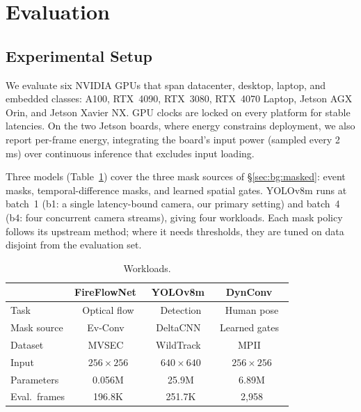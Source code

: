 \section{Evaluation}
\label{sec:eval}

\subsection{Experimental Setup}
\label{sec:eval:setup}

We evaluate six NVIDIA GPUs that span datacenter, desktop, laptop, and
embedded classes: A100, RTX~4090, RTX~3080, RTX~4070 Laptop, Jetson AGX Orin,
and Jetson Xavier NX. GPU clocks are locked on every platform for stable latencies. On the two Jetson boards, where energy constrains deployment, we also report per-frame energy, integrating the board's input power
(sampled every 2\,ms) over continuous inference that excludes input loading.

Three models (Table~\ref{tab:workloads}) cover the three mask sources of
\S\ref{sec:bg:masked}: event masks, temporal-difference masks, and learned
spatial gates. YOLOv8m runs at batch~1 (b1: a single latency-bound camera, our
primary setting) and batch~4 (b4: four concurrent camera streams), giving four
workloads. Each mask policy follows its upstream method; where it needs
thresholds, they are tuned on data disjoint from the evaluation set.

\begin{table}[t]
\centering
\caption{Workloads.}
\label{tab:workloads}
\small
\setlength{\tabcolsep}{4pt}
\begin{tabular}{@{}lccc@{}}
\toprule
 & \textbf{FireFlowNet}~\cite{fireflownet} & \textbf{YOLOv8m}~\cite{yolov8} & \textbf{DynConv}~\cite{dynconv} \\
\midrule
Task & Optical flow & Detection & Human pose \\
Mask source & Ev-Conv~\cite{evconv} & DeltaCNN~\cite{deltacnn} & Learned gates~\cite{dynconv} \\
Dataset & MVSEC~\cite{mvsec} & WildTrack~\cite{wildtrack} & MPII~\cite{mpii} \\
Input & $256{\times}256$ & $640{\times}640$ & $256{\times}256$ \\
Parameters & 0.056M & 25.9M & 6.89M \\
Eval.\ frames & 196.8K & 251.7K & 2,958 \\
\bottomrule
\end{tabular}
\end{table}

